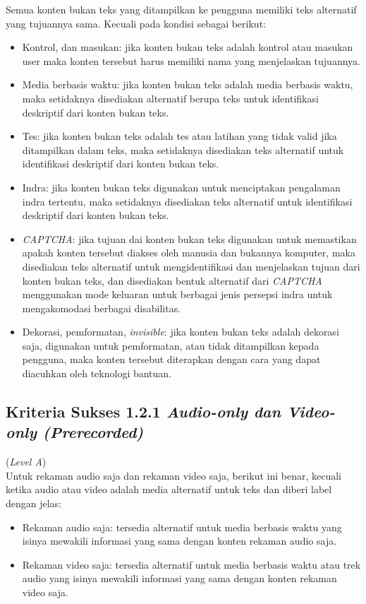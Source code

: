 Semua konten bukan teks yang ditampilkan ke pengguna memiliki teks alternatif yang tujuannya sama. Kecuali pada kondisi sebagai berikut:

\begin{itemize}
	\item Kontrol, dan masukan: jika konten bukan teks adalah kontrol atau masukan user maka konten tersebut harus memiliki nama yang menjelaskan tujuannya.
	\item Media berbasis waktu: jika konten bukan teks adalah media berbasis waktu, maka setidaknya disediakan alternatif berupa teks untuk identifikasi deskriptif dari konten bukan teks.
	\item Tes: jika konten bukan teks adalah tes atau latihan yang tidak valid jika ditampilkan dalam teks, maka setidaknya disediakan teks alternatif untuk identifikasi deskriptif dari konten bukan teks.
	\item Indra: jika konten bukan teks digunakan untuk menciptakan pengalaman indra tertentu, maka setidaknya disediakan teks alternatif untuk identifikasi deskriptif dari konten bukan teks.
	\item \textit{CAPTCHA}: jika tujuan dai konten bukan teks digunakan untuk memastikan apakah konten tersebut diakses oleh manusia dan bukannya komputer, maka disediakan teks alternatif untuk mengidentifikasi dan menjelaskan tujuan dari konten bukan teks, dan disediakan bentuk alternatif dari \textit{CAPTCHA} menggunakan mode keluaran untuk berbagai jenis persepsi indra untuk mengakomodasi berbagai disabilitas.
	\item Dekorasi, pemformatan, \textit{invisible}: jika konten bukan teks adalah dekorasi saja, digunakan untuk pemformatan, atau tidak ditampilkan kepada pengguna, maka konten tersebut diterapkan dengan cara yang dapat diacuhkan oleh teknologi bantuan.
\end{itemize} 

\subsection{Kriteria Sukses 1.2.1 \textit{Audio-only dan Video-only (Prerecorded)}}
\label{subsec:kriteria_1.2.1}
(\textit{Level A}) \\

Untuk rekaman audio saja dan rekaman video saja, berikut ini benar, kecuali ketika audio atau video adalah media alternatif untuk teks dan diberi label dengan jelas: 
\begin{itemize}
	\item Rekaman audio saja: tersedia alternatif untuk media berbasis waktu yang isinya mewakili informasi yang sama dengan konten rekaman audio saja.
	\item Rekaman video saja: tersedia alternatif untuk media berbasis waktu atau trek audio yang isinya mewakili informasi yang sama dengan konten rekaman video saja.
\end{itemize}

